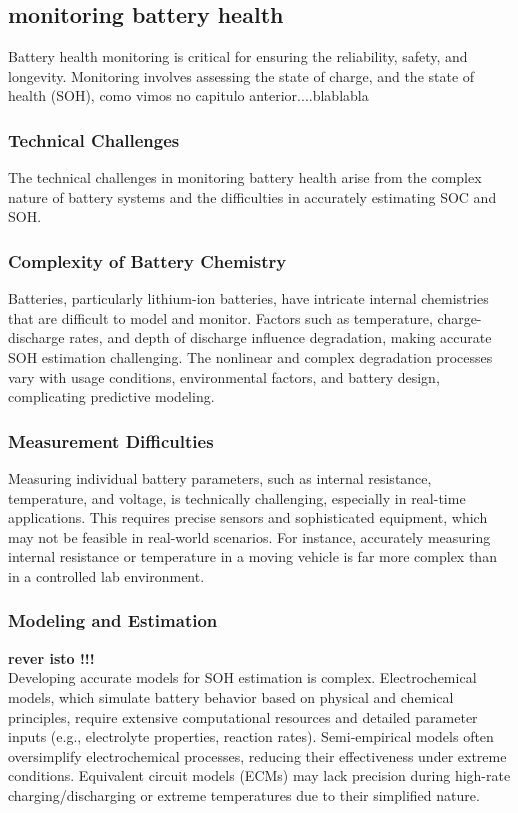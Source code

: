 \subsection{monitoring battery health}
Battery health monitoring is critical for ensuring the reliability, safety, and longevity. Monitoring involves assessing the state of charge,
and the state of health (SOH),
como vimos no capitulo anterior....blablabla
\subsubsection{Technical Challenges}
The technical challenges in monitoring battery health arise from the complex nature of battery systems and the difficulties in accurately estimating SOC and SOH.

\subsubsection{Complexity of Battery Chemistry}
Batteries, particularly lithium-ion batteries, have intricate internal chemistries that are difficult to model and monitor.
Factors such as temperature, charge-discharge rates, and depth of discharge influence degradation, making accurate SOH estimation challenging. 
The nonlinear and complex degradation processes vary with usage conditions, environmental factors, and battery design, complicating predictive modeling.

\subsubsection{Measurement Difficulties}
Measuring individual battery parameters, such as internal resistance, temperature, and voltage, is technically challenging, especially in real-time applications. 
This requires precise sensors and sophisticated equipment, which may not be feasible in real-world scenarios. 
For instance, accurately measuring internal resistance or temperature in a moving vehicle is far more complex than in a controlled lab environment.

\subsubsection{Modeling and Estimation}
\textbf{rever isto !!!} \\
Developing accurate models for SOH estimation is complex. 
Electrochemical models, which simulate battery behavior based on physical and chemical principles, require extensive computational resources and detailed parameter inputs (e.g., electrolyte properties, reaction rates). 
Semi-empirical models often oversimplify electrochemical processes, reducing their effectiveness under extreme conditions. Equivalent circuit models (ECMs) may lack precision during high-rate charging/discharging or extreme temperatures due to their simplified nature.

